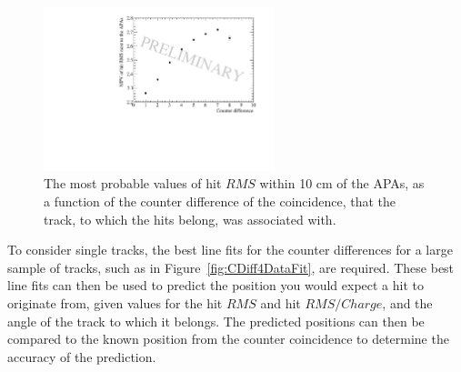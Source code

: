 \begin{figure}
  \centering
  \includegraphics[width=0.6\textwidth]{InterceptCanvasData}
  \caption[The angular dependence of diffusion in the 35 ton dataset for hits within 10 cm of the APAs]
          {The most probable values of hit $RMS$ within 10 cm of the APAs, as a function of the counter difference of the coincidence, that the track, to which the hits belong, was associated with.}
  \label{fig:DiffData_AngFit}
\end{figure}

To consider single tracks, the best line fits for the counter differences for a large sample of tracks, such as in Figure~\ref{fig:CDiff4DataFit}, are required. These best line fits can then be used to predict the position you would expect a hit to originate from, given values for the hit $RMS$ and hit $RMS/Charge$, and the angle of the track to which it belongs. The predicted positions can then be compared to the known position from the counter coincidence to determine the accuracy of the prediction. \\


